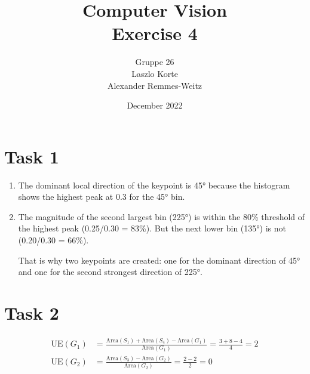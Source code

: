 \documentclass{article}
\title{Computer Vision\\Exercise 4}
\author{Gruppe 26\\Laszlo Korte\\Alexander Remmes-Weitz
}
\date{December 2022}
\begin{document}
\maketitle

\section*{Task 1}


\begin{enumerate}[label=(\alph*)]
    \item The dominant local direction of the keypoint is 45° because the histogram shows the highest peak at 0.3 for the 45° bin.
    \item The magnitude of the second largest bin (225°) is within the 80\% threshold of the highest peak (0.25/0.30 = 83\%). But the next lower bin (135°) is not (0.20/0.30 = 66\%). 
    
    That is why two keypoints are created: one for the dominant direction of 45° and one for the second strongest direction of 225°.
\end{enumerate}


\section*{Task 2}

\begin{align*}
\mathrm{UE}(G_1) &= \frac{\mathrm{Area}(S_1) + \mathrm{Area}(S_4) - \mathrm{Area}(G_1)}{\mathrm{Area}(G_1)} = \frac{3 + 8 - 4}{4} = 2 \\
\mathrm{UE}(G_2) &= \frac{\mathrm{Area}(S_3) - \mathrm{Area}(G_2)}{\mathrm{Area}(G_2)} = \frac{2-2}{2} = 0
\end{align*}
\end{document}
